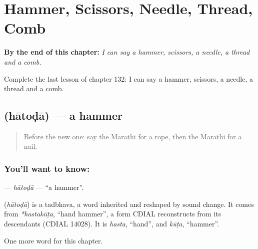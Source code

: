
\chapter{Hammer, Scissors, Needle, Thread, Comb}
\label{ch:mr-hammer-scissors-needle-thread-comb}

\begin{chapteropening}
\textbf{By the end of this chapter:} \emph{I can say a hammer, scissors, a needle, a thread and a comb.}

Complete the last lesson of chapter 132: I can say a hammer, scissors, a needle, a thread and a comb.
\end{chapteropening}

\section[\texorpdfstring{\mr{हातोडा} (hātoḍā)}{हातोडा (hātoḍā)}]{ (hātoḍā) — a hammer}

\label{lesson:MR-C132-hatoda}



\begin{quote}
Before the new one: say the Marathi for a rope, then the Marathi for a nail.
\end{quote}

\subsection*{You'll want to know: }
\textbf{} — \emph{hātoḍā} — \textquotedblleft{}a hammer\textquotedblright{}.

\begin{cousinweb}
\textbf{} (\emph{hātoḍā}) is a tadbhava, a word inherited and reshaped by sound change. It comes from \emph{*hastakūṭa}, \textquotedblleft{}hand hammer\textquotedblright{}, a form CDIAL reconstructs from its descendants (CDIAL 14028). It is \emph{hasta}, \textquotedblleft{}hand\textquotedblright{}, and \emph{kūṭa}, \textquotedblleft{}hammer\textquotedblright{}.
\end{cousinweb}

\begin{grammarlens}[title={What you've built}]
One more word for this chapter.
\end{grammarlens}

